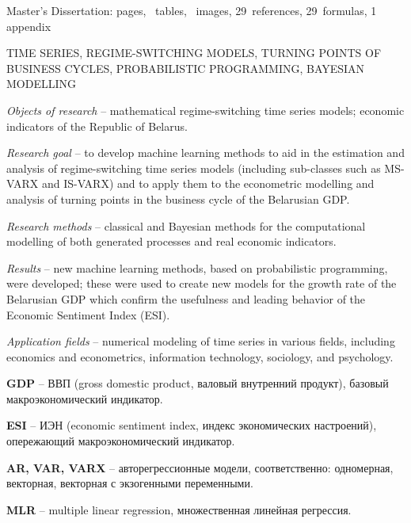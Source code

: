\documentclass[a4paper,14pt]{extreport}
\newcommand{\totalreferences}{29}
\newcommand{\totalformulas}{29}
\begin{document}

Master's Dissertation: \pageref{LastPage} pages, \totaltables\ tables, \totalfigures\ images, \totalreferences\ references, \totalformulas\ formulas, 1 appendix

\MakeUppercase{time series, regime-switching models, turning points of business cycles, probabilistic programming, Bayesian modelling}

\textit{Objects of research} -- mathematical regime-switching time series models; economic indicators of the Republic of Belarus.

\textit{Research goal} -- to develop machine learning methods to aid in the estimation and analysis of regime-switching time series models (including sub-classes such as MS-VARX and IS-VARX) and to apply them to the econometric modelling and analysis of turning points in the business cycle of the Belarusian GDP.

\textit{Research methods} -- classical and Bayesian methods for the computational modelling of both generated processes and real economic indicators.

\textit{Results} -- new machine learning methods, based on probabilistic programming, were developed; these were used to create new models for the growth rate of the Belarusian GDP which confirm the usefulness and leading behavior of the Economic Sentiment Index (ESI).

\textit{Application fields} -- numerical modeling of time series in various fields, including economics and econometrics, information technology, sociology, and psychology.




\clearpage
\renewcommand{\contentsname}{Содержание}
\tableofcontents



\textbf{GDP} -- ВВП (gross domestic product, валовый внутренний продукт), базовый макроэкономический индикатор.

\textbf{ESI} -- ИЭН (economic sentiment index, индекс экономических настроений), опережающий макроэкономический индикатор.

\textbf{AR, VAR, VARX} -- авторегрессионные модели, соответственно: одномерная, векторная, векторная с экзогенными переменными.

\textbf{MLR} -- multiple linear regression, множественная линейная регрессия.
\end{document}
